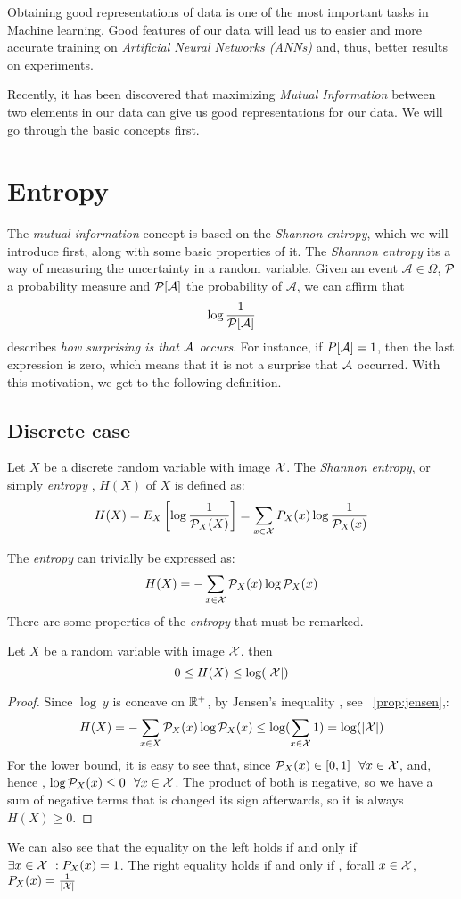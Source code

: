 Obtaining good representations of data is one of the most important tasks in Machine learning. Good features of our data will lead us to easier and more accurate training on \emph{Artificial Neural Networks (ANNs)} and, thus, better results on experiments.

Recently, it has been discovered that maximizing \emph{Mutual Information} between two elements in our data can give us good representations for our data. We will go through the basic concepts first.


\section{Entropy}

The \emph{mutual information} concept is based on the \emph{Shannon entropy}, which we will introduce first, along with some basic properties of it. The \emph{Shannon entropy} its a way of measuring the uncertainty in a random variable. Given an event $\mathcal A \in \Omega$, $\mathcal{P}$ a probability measure and $\mathcal{P}[\mathcal A]$ the probability of $\mathcal A$, we can affirm that 
$$
\log\frac{1}{\mathcal{P}[\mathcal A]}
$$
describes \emph{how surprising is that $\mathcal A$ occurs}. For instance, if $P[\mathcal A] = 1$, then the last expression is zero, which means that it is not a surprise that $\mathcal A$ occurred. With this motivation, we get to the following definition.

\subsection{Discrete case}

\begin{ndef}
Let $X$ be a discrete random variable with image $\mathcal{X}$. The \emph{Shannon entropy}, or simply \emph{entropy} , $H(X)$ of $X$ is defined as:
$$
H(X) = E_X\left[\log\frac{1}{\mathcal{P}_X(X)}\right] =  \sum_{x \in \mathcal{X}} P_X(x) \log\frac{1}{\mathcal{P}_X(x)}
$$
\end{ndef}
The \emph{entropy} can trivially be expressed as:
$$
H(X) = - \sum_{x \in \mathcal{X}}\mathcal{P}_X (x)\log \mathcal{P}_X(x)
$$
There are some properties of the \emph{entropy} that must be remarked. 
\begin{nprop}
    Let $X$ be a random variable with image $\mathcal{X}$. then
    $$
0 \leq H(X) \leq \log(|\mathcal{X}|)
    $$
\end{nprop}
\begin{proof}
    Since $\log \ y$ is concave on $\mathbb{R}^+$, by Jensen's inequality , see ~\ref{prop:jensen},:
    $$
    H(X) = - \sum_{x \in X}\mathcal{P}_X (x)\log \mathcal{P}_X(x) \leq \log(\sum_{x \in \mathcal{X}} 1) = \log(|\mathcal{X}|)
    $$
    For the lower bound, it is easy to see that, since $\mathcal{P}_X(x) \in [0,1] \ \  \forall x \in \mathcal{X} $, and, hence , $\log \mathcal{P}_X(x) \leq 0 \ \ \forall x \in \mathcal{X}$. The product of both is negative, so we have a sum of negative terms that is changed its sign afterwards, so it is always $H(X) \geq 0$. 
\end{proof}
We can also see that the equality on the left holds if and only if $\exists x \in \mathcal{X} \ : P_X(x) = 1$. The right equality holds if and only if , forall $x \in \mathcal{X}$, $P_X(x) = \frac{1}{\lvert\mathcal{X}\rvert}$

